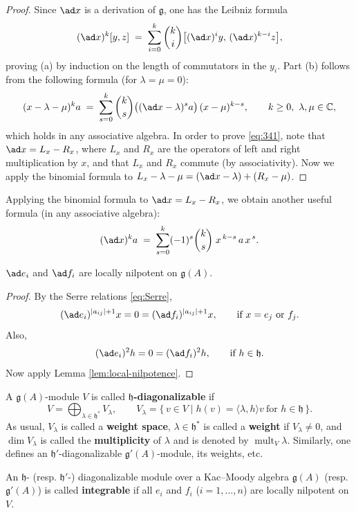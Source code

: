 \documentclass[12pt]{article}
\begin{document}
\begin{proof}
    Since $\ad x$ is a derivation of $\mathfrak{g}$, one has the Leibniz formula
    \[
        (\ad x)^k [y,z] \;=\; \sum_{i=0}^{k} \binom{k}{i}
        \big[(\ad x)^i y,\, (\ad x)^{k-i} z\big],
    \]
    proving (a) by induction on the length of commutators in the $y_i$.
    Part (b) follows from the following formula (for $\lambda=\mu=0$):
    \begin{equation}\label{eq:341}
        (x-\lambda-\mu)^k a \;=\; \sum_{s=0}^{k} \binom{k}{s}
        \big((\ad x-\lambda)^s a\big)\,(x-\mu)^{k-s}, \qquad k\ge 0,\ \lambda,\mu\in\mathbb{C},
    \end{equation}
    which holds in any associative algebra. In order to prove \eqref{eq:341}, note
    that $\ad x=L_x-R_x$, where $L_x$ and $R_x$ are the operators of left and right
    multiplication by $x$, and that $L_x$ and $R_x$ commute (by associativity).
    Now we apply the binomial formula to $L_x-\lambda-\mu=(\ad x-\lambda)+(R_x-\mu)$.
    \qedhere
\end{proof}

Applying the binomial formula to $\ad x=L_x-R_x$, we obtain another useful
formula (in any associative algebra):
\begin{equation}\label{eq:342}
    (\ad x)^k a \;=\; \sum_{s=0}^{k}(-1)^s \binom{k}{s}\; x^{\,k-s}\, a\, x^{\,s}.
\end{equation}

\begin{lemma}\label{lem:Chevalley-nilpotent}
    $\ad e_i$ and $\ad f_i$ are locally nilpotent on $\mathfrak{g}(A)$.
\end{lemma}

\begin{proof}
    By the Serre relations \eqref{eq:Serre},
    \[
        (\ad e_i)^{|a_{ij}|+1}x = 0 = (\ad f_i)^{|a_{ij}|+1}x, \qquad
        \text{if } x=e_j \text{ or } f_j.
    \]
    Also,
    \[
        (\ad e_i)^2 h = 0 = (\ad f_i)^2 h, \qquad \text{if } h\in \mathfrak{h}.
    \]
    Now apply Lemma \ref{lem:local-nilpotence}.
\end{proof}


\begin{definition}
    A $\mathfrak{g}(A)$-module $V$ is called \textbf{$\mathfrak{h}$-diagonalizable} if
    \[
        V = \bigoplus_{\lambda\in\mathfrak{h}^*} V_\lambda,
        \qquad
        V_\lambda = \{\,v\in V \mid h(v) = \langle \lambda,h\rangle v
        \ \text{for } h\in\mathfrak{h}\,\}.
    \]
    As usual, $V_\lambda$ is called a \textbf{weight space},
    $\lambda \in \mathfrak{h}^*$ is called a \textbf{weight} if $V_\lambda \neq 0$,
    and $\dim V_\lambda$ is called the \textbf{multiplicity} of $\lambda$ and is denoted
    by $\operatorname{mult}_V \lambda$. Similarly, one defines an $\mathfrak{h}'$-diagonalizable
    $\mathfrak{g}'(A)$-module, its weights, etc.

    An $\mathfrak{h}$- (resp. $\mathfrak{h}'$-) diagonalizable module over a Kac--Moody
    algebra $\mathfrak{g}(A)$ (resp. $\mathfrak{g}'(A)$) is called \textbf{integrable} if all $e_i$ and $f_i$ ($i=1,\dots,n$) are locally nilpotent on $V$.
\end{definition}
\end{document}
